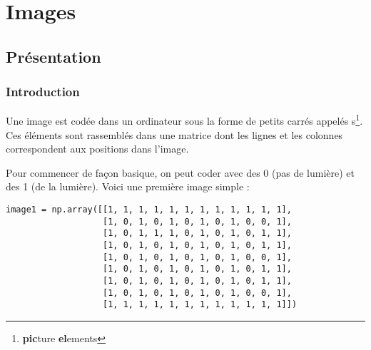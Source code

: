 \chapter{Images}
\thispagestyle{empty}
\section{Présentation}
\subsection{Introduction}
Une image est codée dans un ordinateur sous la forme de petits carrés appelés s\footnote{{\bf pic}ture {\bf el}ements}. Ces éléments sont rassemblés dans une matrice dont les lignes et les colonnes correspondent aux positions dans l'image.

Pour commencer de façon basique, on peut coder avec des 0 (pas de lumière) et des 1  (de la lumière). 
Voici une première image simple :

\begin{verbatim}
image1 = np.array([[1, 1, 1, 1, 1, 1, 1, 1, 1, 1, 1, 1], 
                   [1, 0, 1, 0, 1, 0, 1, 0, 1, 0, 0, 1], 
                   [1, 0, 1, 1, 1, 0, 1, 0, 1, 0, 1, 1], 
                   [1, 0, 1, 0, 1, 0, 1, 0, 1, 0, 1, 1], 
                   [1, 0, 1, 0, 1, 0, 1, 0, 1, 0, 0, 1], 
                   [1, 0, 1, 0, 1, 0, 1, 0, 1, 0, 1, 1], 
                   [1, 0, 1, 0, 1, 0, 1, 0, 1, 0, 1, 1], 
                   [1, 0, 1, 0, 1, 0, 1, 0, 1, 0, 0, 1], 
                   [1, 1, 1, 1, 1, 1, 1, 1, 1, 1, 1, 1]])
\end{verbatim}

